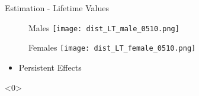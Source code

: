 \documentclass{beamer}
\begin{document}
\begin{frame}{Estimation - Lifetime Values}\label{EstimationLT2014}
\begin{figure}[!t]
\centering
\begin{minipage}[b]{0.48\textwidth}{Males}
\centering
\texttt{[image: dist\_LT\_male\_0510.png]}
\end{minipage}
\begin{minipage}[b]{0.48\textwidth}{Females}
\centering
\texttt{[image: dist\_LT\_female\_0510.png]}
\end{minipage}
\end{figure}
\begin{itemize}
\setlength{\itemsep}{0.7 cm}
\item Persistent Effects
\end{itemize}
\hyperlink{EstimationLT}{}
\end{frame}



%
\begin{frame}<0>
\addtocounter{framenumber}{-1} 
\scriptsize


\end{frame}

%
%
%
%
\end{document}
